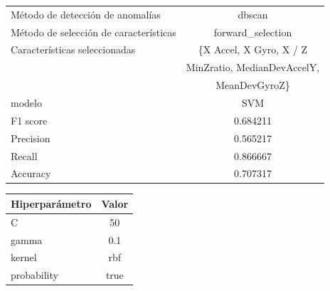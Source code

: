 \begin{appendices}
\begin{table}[htb]
			\begin{tabular}{lc}
				\toprule
					  Método de detección de anomalías &                                             dbscan \\
				Método de selección de características &                                  forward\_selection \\
						 Características seleccionadas &							\{X Accel, X Gyro, X / Z \\
						 							   &							MinZratio, MedianDevAccelY, \\
													   &										MeanDevGyroZ\} \\
												modelo &                                                SVM \\
											  F1 score &                                           0.684211 \\
											 Precision &                                           0.565217 \\
												Recall &                                           0.866667 \\
											  Accuracy &                                           0.707317 \\
				\bottomrule
			\end{tabular}
			\newline
			\newline

			\begin{tabular}{lc}
				\toprule
				Hiperparámetro & Valor \\
				\midrule
							 C &    50 \\
						 gamma &   0.1 \\
						kernel &   rbf \\
				   probability &  true \\
				\bottomrule
			\end{tabular}
			
		\end{table}


\end{appendices}
